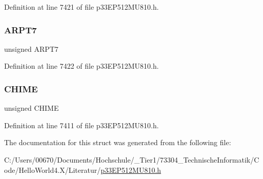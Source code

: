 Definition at line 7421 of file p33\+E\+P512\+M\+U810.\+h.

\mbox{\label{structtag_a_l_c_f_g_r_p_t_b_i_t_s_a830c8a9e2d9044cd3da8bbb069573dbf}} 
\subsubsection{\texorpdfstring{A\+R\+P\+T7}{ARPT7}}
{\footnotesize\ttfamily unsigned A\+R\+P\+T7}



Definition at line 7422 of file p33\+E\+P512\+M\+U810.\+h.

\mbox{\label{structtag_a_l_c_f_g_r_p_t_b_i_t_s_ade47a27c0f187a4f3c04149d70f14094}} 
\subsubsection{\texorpdfstring{C\+H\+I\+ME}{CHIME}}
{\footnotesize\ttfamily unsigned C\+H\+I\+ME}



Definition at line 7411 of file p33\+E\+P512\+M\+U810.\+h.



The documentation for this struct was generated from the following file\+:\begin{DoxyCompactItemize}
\item 
C\+:/\+Users/00670/\+Documents/\+Hochschule/\+\_\+\+Tier1/73304\+\_\+\+Technische\+Informatik/\+Code/\+Hello\+World4.\+X/\+Literatur/\hyperlink{p33_e_p512_m_u810_8h}{p33\+E\+P512\+M\+U810.\+h}\end{DoxyCompactItemize}
